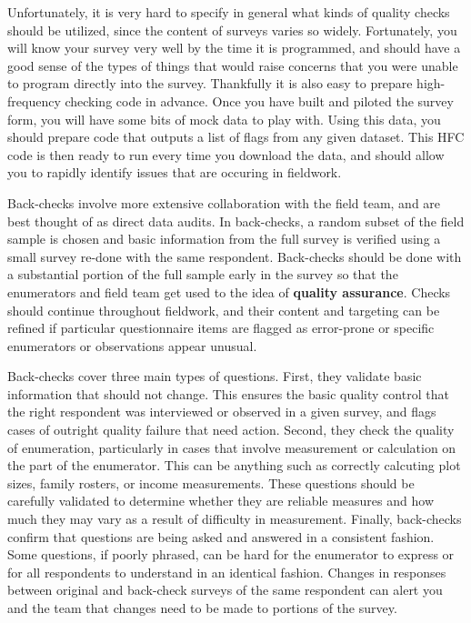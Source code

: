 Unfortunately, it is very hard to specify in general
what kinds of quality checks should be utilized,
since the content of surveys varies so widely.
Fortunately, you will know your survey very well
by the time it is programmed, and should have a good sense
of the types of things that would raise concerns
that you were unable to program directly into the survey.
Thankfully it is also easy to prepare high-frequency checking code in advance.
Once you have built and piloted the survey form,
you will have some bits of mock data to play with.
Using this data, you should prepare code that outputs
a list of flags from any given dataset.
This HFC code is then ready to run every time you download the data,
and should allow you to rapidly identify issues
that are occuring in fieldwork.

Back-checks
involve more extensive collaboration with the field team,
and are best thought of as direct data audits.
In back-checks, a random subset of the field sample is chosen
and basic information from the full survey is verified
using a small survey re-done with the same respondent.
Back-checks should be done with a substantial portion
of the full sample early in the survey
so that the enumerators and field team
get used to the idea of \textbf{quality assurance}.
Checks should continue throughout fieldwork,
and their content and targeting can be refined if particular
questionnaire items are flagged as error-prone
or specific enumerators or observations appear unusual.

Back-checks cover three main types of questions.
First, they validate basic information that should not change.
This ensures the basic quality control that the right respondent
was interviewed or observed in a given survey,
and flags cases of outright quality failure that need action.
Second, they check the quality of enumeration,
particularly in cases that involve measurement or calculation
on the part of the enumerator.
This can be anything such as correctly calcuting plot sizes,
family rosters, or income measurements.
These questions should be carefully validated
to determine whether they are reliable measures
and how much they may vary as a result of difficulty in measurement.
Finally, back-checks confirm that questions are being asked and answered
in a consistent fashion. Some questions, if poorly phrased,
can be hard for the enumerator to express or for all respondents
to understand in an identical fashion.
Changes in responses between original and back-check surveys
of the same respondent
can alert you and the team that changes need to be made
to portions of the survey.

